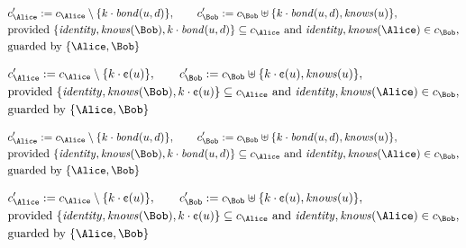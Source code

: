 \begin{align*}
&
c'_
{
\Alice
}
 := 
c_
{
\Alice
}
 \setminus 
\{
k
\cdot
\mathit{
bond
}
(
u
,
d
)
\}
, \qquad 
c'_
{
\Bob
}
 := 
c_
{
\Bob
}
 \uplus 
\{
k
\cdot
\mathit{
bond
}
(
u
,
d
)
,
\mathit{
knows
}
(
u
)
\}
,\\
&
\text{provided } 
\{
\mathit{
identity
}
,
\mathit{
knows
}
(
\Bob
)
,
k
\cdot
\mathit{
bond
}
(
u
,
d
)
\}
 \subseteq c_
{
\Alice
}
 \text{ and } 
\mathit{
identity
}
,
\mathit{
knows
}
(
\Alice
)
 \in c_
{
\Bob
}
,\\
&
\text{guarded by } \{
\Alice
,
\Bob
\}
\end{align*}

\begin{align*}
&
c'_
{
\Alice
}
 := 
c_
{
\Alice
}
 \setminus 
\{
k
\cdot
\text{\textcent}
(
u
)
\}
, \qquad 
c'_
{
\Bob
}
 := 
c_
{
\Bob
}
 \uplus 
\{
k
\cdot
\text{\textcent}
(
u
)
,
\mathit{
knows
}
(
u
)
\}
,\\
&
\text{provided } 
\{
\mathit{
identity
}
,
\mathit{
knows
}
(
\Bob
)
,
k
\cdot
\text{\textcent}
(
u
)
\}
 \subseteq c_
{
\Alice
}
 \text{ and } 
\mathit{
identity
}
,
\mathit{
knows
}
(
\Alice
)
 \in c_
{
\Bob
}
,\\
&
\text{guarded by } \{
\Alice
,
\Bob
\}
\end{align*}

\begin{align*}
&
c'_
{
\Alice
}
 := 
c_
{
\Alice
}
 \setminus 
\{
k
\cdot
\mathit{
bond
}
(
u
,
d
)
\}
, \qquad 
c'_
{
\Bob
}
 := 
c_
{
\Bob
}
 \uplus 
\{
k
\cdot
\mathit{
bond
}
(
u
,
d
)
,
\mathit{
knows
}
(
u
)
\}
,\\
&
\text{provided } 
\{
\mathit{
identity
}
,
\mathit{
knows
}
(
\Bob
)
,
k
\cdot
\mathit{
bond
}
(
u
,
d
)
\}
 \subseteq c_
{
\Alice
}
 \text{ and } 
\mathit{
identity
}
,
\mathit{
knows
}
(
\Alice
)
 \in c_
{
\Bob
}
,\\
&
\text{guarded by } \{
\Alice
,
\Bob
\}
\end{align*}

\begin{align*}
&
c'_
{
\Alice
}
 := 
c_
{
\Alice
}
 \setminus 
\{
k
\cdot
\text{\textcent}
(
u
)
\}
, \qquad 
c'_
{
\Bob
}
 := 
c_
{
\Bob
}
 \uplus 
\{
k
\cdot
\text{\textcent}
(
u
)
,
\mathit{
knows
}
(
u
)
\}
,\\
&
\text{provided } 
\{
\mathit{
identity
}
,
\mathit{
knows
}
(
\Bob
)
,
k
\cdot
\text{\textcent}
(
u
)
\}
 \subseteq c_
{
\Alice
}
 \text{ and } 
\mathit{
identity
}
,
\mathit{
knows
}
(
\Alice
)
 \in c_
{
\Bob
}
,\\
&
\text{guarded by } \{
\Alice
,
\Bob
\}
\end{align*}
